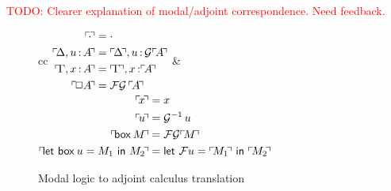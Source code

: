 \documentclass[11pt]{article}
\newcommand{\todo}[1]{\textcolor{red}{\small TODO: #1}}
\begin{document}



\todo{Clearer explanation of modal/adjoint correspondence. Need feedback.}


\begin{figure}[h]
  \centering
  \begin{tabular}{cc}
    \(\begin{aligned}
      \trans{\ecx} &= \ecx\\
      \trans{\D, u \of A} &= \trans{\D}, u \of \fG \trans{A}\\
      \trans{\G, x \of A} &= \trans{\G}, x \of \trans{A}\\
      \trans{\nec A} &= \fF \fG\, \trans{A}
    \end{aligned}\) &
    \(\begin{aligned}
      \trans{x} &= x\\
      \trans{u} &= \Ginv{u}\\
      \trans{\ebox{M}} &= \Fbox{\Gbox{\trans{M}}}\\
      \trans{\letbox{u}{M_1}{M_2}} &= \letF{u}{\trans{M_1}}{\trans{M_2}}
    \end{aligned}\)
  \end{tabular}
  \caption{Modal logic to adjoint calculus translation}
  \label{fig:trans}
\end{figure}
\end{document}
